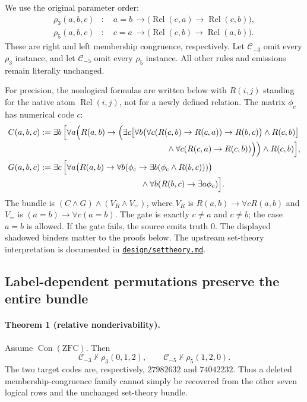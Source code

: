 We use the original parameter order:
\[
 \begin{aligned}
 \rho_3(a,b,c)&:\quad
   a=b\ \to\bigl(\operatorname{Rel}(c,a)\to
                         \operatorname{Rel}(c,b)\bigr),\\
 \rho_5(a,b,c)&:\quad
   c=a\ \to\bigl(\operatorname{Rel}(c,b)\to
                         \operatorname{Rel}(a,b)\bigr).
 \end{aligned}
\]
These are right and left membership congruence, respectively.
Let $\mathcal C_{-3}$ omit every $\rho_3$ instance, and let
$\mathcal C_{-5}$ omit every $\rho_5$ instance. All other rules and
emissions remain literally unchanged.

For precision, the nonlogical formulas are written below with $R(i,j)$
standing for the native atom $\operatorname{Rel}(i,j)$, not for a newly
defined relation. The matrix $\phi_c$ has numerical code $c$:
\[
\begin{aligned}
C(a,b,c):={}&\exists b\,\Bigl[
 \forall a\Bigl(R(a,b)\to\Bigl(
  \exists c\bigl[
   \forall b\bigl(\forall c(R(c,b)\to R(c,a))\to R(b,c)\bigr)
       \land R(c,b)\bigr]\\[-2pt]
 &\hspace{48mm}\land\forall c(R(c,a)\to R(c,b))\Bigr)\Bigr)
       \land R(c,b)\Bigr],\\
G(a,b,c):={}&\exists c\,\Bigl[
 \forall a\bigl(R(a,b)\to
   \forall b(\phi_c\to\exists b(\phi_c\land R(b,c)))\bigr)\\[-2pt]
 &\hspace{37mm}\land\forall b(R(b,c)\to\exists a\phi_c)\Bigr].
\end{aligned}
\]
The bundle is $(C\land G)\land(V_R\land V_=)$, where
$V_R$ is $R(a,b)\to\forall c R(a,b)$ and $V_=$ is
$(a=b)\to\forall c(a=b)$. The gate is exactly $c\ne a$ and $c\ne b$;
the case $a=b$ is allowed. If the gate fails, the source emits truth $0$.
The displayed shadowed binders matter to the proofs below.
The upstream set-theory interpretation is documented in
\href{https://github.com/jeff87654/busy-beaver/blob/zf-254/ZF/m254/design/settheory.md}{\texttt{design/settheory.md}}.

\subsection{Label-dependent permutations preserve the entire bundle}

\paragraph{Theorem 1 (relative nonderivability).}
Assume $\operatorname{Con}(\mathrm{ZFC})$. Then
\[
 \mathcal C_{-3}\nvdash\rho_3(0,1,2),\qquad
 \mathcal C_{-5}\nvdash\rho_5(1,2,0).
\]
The two target codes are, respectively, $27982632$ and $74042232$.
Thus a deleted membership-congruence family cannot simply be recovered
from the other seven logical rows and the unchanged set-theory bundle.

